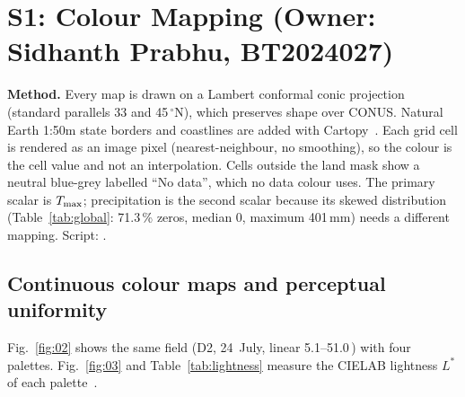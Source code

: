 \section{S1: Colour Mapping (Owner: Sidhanth Prabhu, BT2024027)}
\label{sec:s1}
\textbf{Method.} Every map is drawn on a Lambert conformal conic projection (standard parallels 33 and 45\,$^\circ$N), which
preserves shape over CONUS. Natural Earth 1:50m state borders and coastlines are added with Cartopy~\cite{cartopy}. Each
grid cell is rendered as an image pixel (nearest-neighbour, no smoothing), so the colour is the cell value and not an
interpolation. Cells outside the land mask show a neutral blue-grey labelled ``No data'', which no data colour uses. The
primary scalar is $T_{\max}$; precipitation is the second scalar because its skewed distribution
(Table~\ref{tab:global}: 71.3\,\% zeros, median 0, maximum 401\,mm) needs a different mapping. Script:
.

\subsection{Continuous colour maps and perceptual uniformity}
Fig.~\ref{fig:02} shows the same field (D2, 24~July, linear 5.1--51.0\,\degC) with four palettes. Fig.~\ref{fig:03} and
Table~\ref{tab:lightness} measure the CIELAB lightness $L^*$ of each palette~\cite{borland2007,crameri2020}.





